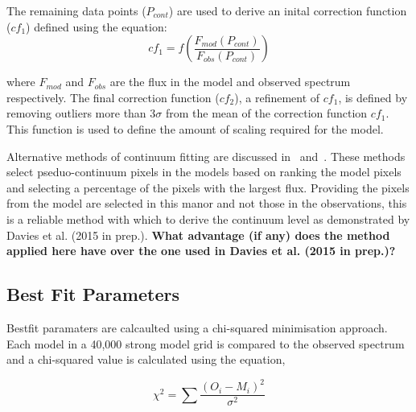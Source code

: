 \documentclass[12pt]{article}
\begin{document}
The remaining data points ($P_{cont}$) are used to derive an inital correction function
($cf_{1}$) defined using the equation:
\begin{equation}
    cf_{1} = f(\frac{F_{mod}(P_{cont})}{F_{obs}(P_{cont})})
\end{equation}

\noindent where $F_{mod}$ and $F_{obs}$ are the flux in the model and observed spectrum respectively.
The final correction function ($cf_{2}$), a refinement of $cf_{1}$,
is defined by removing outliers more than 3$\sigma$ from the mean of the correction function $cf_{1}$.
This function is used to define the amount of scaling required for the model.




Alternative methods of continuum fitting are discussed in~\cite{2010MNRAS.407.1203D} and~\cite{2011A&A...527A..50E}.
These methods select pseduo-continuum pixels in the models based on ranking the model pixels and selecting a percentage of the pixels with the largest flux.
Providing the pixels from the model are selected in this manor and not those in the observations, this is a reliable method with which to derive the continuum level as demonstrated by Davies et al. (2015 in prep.).
\textbf{What advantage (if any) does the method applied here have over the one used in Davies et al. (2015 in prep.)?}

\subsection{Best Fit Parameters} %
\label{sub:best_fit_parameters}

Bestfit paramaters are calcaulted using a chi-squared minimisation approach.
Each model in a 40,000 strong model grid is compared to the observed spectrum
and a chi-squared value is calculated using the equation,

\begin{equation}
    \chi^{2} = \sum{\frac{(O_{i} - M_{i})^{2}}{\sigma^{2}}}
\end{equation}


\end{document}
